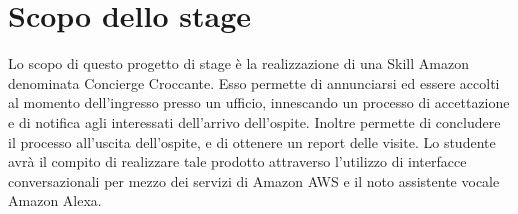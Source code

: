 \section*{Scopo dello stage}
Lo scopo di questo progetto di stage è la realizzazione di una Skill Amazon denominata Concierge Croccante. Esso permette di annunciarsi ed essere accolti al momento dell'ingresso presso un ufficio, innescando un processo di accettazione e di notifica agli interessati dell'arrivo dell'ospite. Inoltre permette di concludere il processo all'uscita dell'ospite, e di ottenere un report delle visite.
Lo studente avrà il compito di realizzare tale prodotto attraverso l'utilizzo di interfacce conversazionali per mezzo dei servizi di Amazon AWS e il noto assistente vocale Amazon Alexa.

